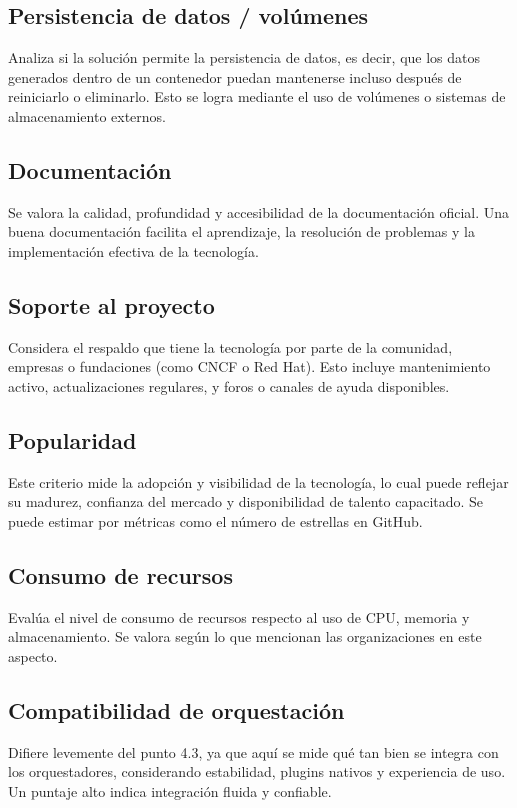 \subsection{Persistencia de datos / volúmenes}
Analiza si la solución permite la persistencia de datos, es decir, que los datos generados dentro de un contenedor puedan mantenerse incluso después de reiniciarlo o eliminarlo. Esto se logra mediante el uso de volúmenes o sistemas de almacenamiento externos.

\subsection{Documentación}
Se valora la calidad, profundidad y accesibilidad de la documentación oficial. Una buena documentación facilita el aprendizaje, la resolución de problemas y la implementación efectiva de la tecnología.

\subsection{Soporte al proyecto}
Considera el respaldo que tiene la tecnología por parte de la comunidad, empresas o fundaciones (como CNCF o Red Hat). Esto incluye mantenimiento activo, actualizaciones regulares, y foros o canales de ayuda disponibles.

\subsection{Popularidad}
Este criterio mide la adopción y visibilidad de la tecnología, lo cual puede reflejar su madurez, confianza del mercado y disponibilidad de talento capacitado. Se puede estimar por métricas como el número de estrellas en GitHub.

\subsection{Consumo de recursos}
Evalúa el nivel de consumo de recursos respecto al uso de CPU, memoria y almacenamiento. Se valora según lo que mencionan las organizaciones en este aspecto.

\subsection{Compatibilidad de orquestación}
Difiere levemente del punto 4.3, ya que aquí se mide qué tan bien se integra con los orquestadores, considerando estabilidad, plugins nativos y experiencia de uso. Un puntaje alto indica integración fluida y confiable.

